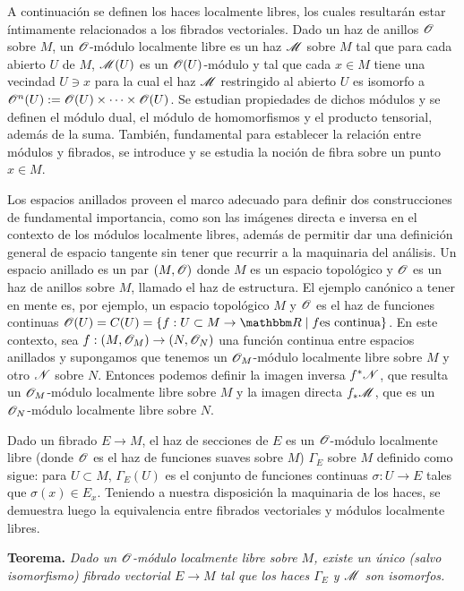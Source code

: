 {A continuaci\'on se definen los haces localmente libres, los cuales resultar\'an estar \'intimamente relacionados a los fibrados vectoriales. Dado un haz de anillos $\mathscr{O}$ sobre $M$, un $\mathscr{O}$-m\'odulo localmente libre es un haz $\mathscr{M}$ sobre $M$ tal que para cada abierto $U$ de $M$, $\mathscr{M}(U)$ es un $\mathscr{O}(U)$-m\'odulo y tal que cada $x\in M$ tiene una vecindad $U\ni x$ para la cual el haz $\mathscr{M}$ restringido al abierto $U$ es isomorfo a $\mathscr{O}^n(U):=\mathscr{O}(U)\times \cdots \times \mathscr{O}(U)$. Se estudian propiedades de dichos m\'odulos y se definen el m\'odulo dual, el m\'odulo de homomorfismos y el producto tensorial, adem\'as de la suma. Tambi\'en, fundamental para establecer la relaci\'on entre m\'odulos y fibrados, se introduce y se estudia la noci\'on de fibra sobre un punto $x\in M$.

Los espacios anillados proveen el marco adecuado para definir dos construcciones de fundamental importancia, como son las im\'agenes directa e inversa en el contexto de los m\'odulos localmente libres, adem\'as de permitir dar una definici\'on general de espacio tangente sin tener que recurrir a la maquinaria del an\'alisis. Un espacio anillado es un par $(M,\mathscr{O})$ donde $M$ es un espacio topol\'ogico y $\mathscr{O}$ es un haz de anillos sobre $M$, llamado el haz de estructura. El ejemplo can\'onico a tener en mente es, por ejemplo, un espacio topol\'ogico $M$ y $\mathscr{O}$ es el haz de funciones continuas $\scr{O}(U)=C(U)=\{f:U\subset M \to \re \; | \; f \text{es continua}\}$. En este contexto, sea $f:(M,\mathscr{O}_M)\to (N,\mathscr{O}_N)$ una funci\'on continua entre espacios anillados y supongamos que tenemos un $\mathscr{O}_M$-m\'odulo localmente libre sobre $M$ y otro $\mathscr{N}$ sobre $N$. Entonces podemos definir la imagen inversa $f^*\mathscr{N}$, que resulta un $\mathscr{O}_M$-m\'odulo localmente libre sobre $M$ y la imagen directa $f_*\mathscr{M}$, que es un $\mathscr{O}_N$-m\'odulo localmente libre sobre $N$.

Dado un fibrado $E\to M$, el haz de secciones de $E$ es un $\mathscr{O}$-m\'odulo localmente libre (donde $\mathscr{O}$ es el haz de funciones suaves sobre $M$) $\Gamma_E$ sobre $M$ definido como sigue: para $U\subset M$, $\Gamma_E(U)$ es el conjunto de funciones continuas $\sigma :U\to E$ tales que $\sigma (x)\in E_x$. Teniendo a nuestra disposici\'on la maquinaria de los haces, se demuestra luego la equivalencia entre fibrados vectoriales y m\'odulos localmente libres.

\medskip
{\bf Teorema.}
{\it Dado un $\mathscr{O}$-m\'odulo localmente libre sobre $M$, existe un \'unico (salvo isomorfismo) fibrado vectorial $E\to M$ tal que los haces $\Gamma_E$ y $\mathscr{M}$ son isomorfos.}
\medskip

}
